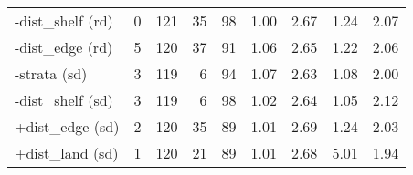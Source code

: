 \documentclass{svjour3}
\begin{document}
\begin{table}[htbp]
\begin{tabular}{lrrrrrrrr}
  -dist\_shelf (rd) & 0 & 121 & 35 & 98 & 1.00 & 2.67 & 1.24 & 2.07 \\
  -dist\_edge (rd) & 5 & 120 & 37 & 91 & 1.06 & 2.65 & 1.22 & 2.06 \\
  -strata (sd) & 3 & 119 & 6 & 94 & 1.07 & 2.63 & 1.08 & 2.00 \\
  -dist\_shelf (sd) & 3 & 119 & 6 & 98 & 1.02 & 2.64 & 1.05 & 2.12 \\
  +dist\_edge (sd) & 2 & 120 & 35 & 89 & 1.01 & 2.69 & 1.24 & 2.03 \\
  +dist\_land (sd) & 1 & 120 & 21 & 89 & 1.01 & 2.68 & 5.01 & 1.94 \\
   \hline
\end{tabular}
\label{tab:extrap2013wBS}
\end{table}
\end{document}
